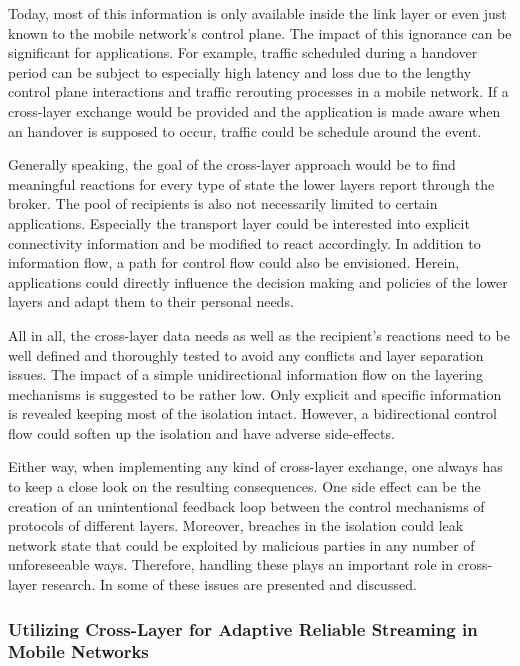 Today, most of this information is only available inside the link layer or even just known to the mobile network's control plane. The impact of this ignorance can be significant for applications. For example, traffic scheduled during a handover period can be subject to especially high latency and loss due to the lengthy control plane interactions and traffic rerouting processes in a mobile network. If a cross-layer exchange would be provided and the application is made aware when an handover is supposed to occur, traffic could be schedule around the event. 

Generally speaking, the goal of the cross-layer approach would be to find meaningful reactions for every type of state the lower layers report through the broker. The pool of recipients is also not necessarily limited to certain applications. Especially the transport layer could be interested into explicit connectivity information and be modified to react accordingly. In addition to information flow, a path for control flow could also be envisioned. Herein, applications could directly influence the decision making and policies of the lower layers and adapt them to their personal needs.

All in all, the cross-layer data needs as well as the recipient's reactions need to be well defined and thoroughly tested to avoid any conflicts and layer separation issues. The impact of a simple unidirectional information flow on the layering mechanisms is suggested to be rather low. Only explicit and specific information is revealed keeping most of the isolation intact. However, a bidirectional control flow could soften up the isolation and have adverse side-effects. 

Either way, when implementing any kind of cross-layer exchange, one always has to keep a close look on the resulting consequences. One side effect can be the creation of an unintentional feedback loop between the control mechanisms of protocols of different layers. Moreover, breaches in the isolation could leak network state that could be exploited by malicious parties in any number of unforeseeable ways. Therefore, handling these plays an important role in cross-layer research. In \cite{1404568} some of these issues are presented and discussed.


\subsubsection{Utilizing Cross-Layer for Adaptive Reliable Streaming in Mobile Networks}

